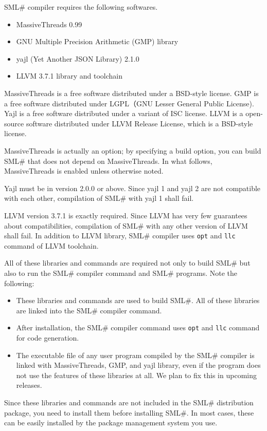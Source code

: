 \documentclass{jbook}
\newcommand{\smlsharp}{SML\#}
\begin{document}
	\smlsharp{} compiler requires the following softwares.
\begin{itemize}
\item MassiveThreads 0.99
\item GNU Multiple Precision Arithmetic (GMP) library
\item yajl (Yet Another JSON Library) 2.1.0
\item LLVM 3.7.1 library and toolchain
\end{itemize}
	MassiveThreads is a free software distributed under a BSD-style
license.
	GMP is a free software distributed under LGPL（GNU Lesser General
Public License).
	Yajl is a free software distributed under a variant of ISC license.
	LLVM is a open-source software distributed under LLVM Release License,
which is a BSD-style license.

	MassiveThreads is actually an option;
by specifying a build option,
you can build \smlsharp{} that does not depend on MassiveThreads.
	In what follows,
MassiveThreads is enabled unless otherwise noted.

	Yajl must be in version 2.0.0 or above.
	Since yajl 1 and yajl 2 are not compatible with each other,
compilation of \smlsharp{} with yajl 1 shall fail.

	LLVM version 3.7.1 is exactly required.
	Since LLVM has very few guarantees about compatibilities,
compilation of \smlsharp{} with any other version of LLVM shall fail.
	In addition to LLVM library,
\smlsharp{} compiler uses {\tt opt} and {\tt llc} command of
LLVM toolchain.

	All of these libraries and commands are required not only to
build \smlsharp{} but also to run the \smlsharp{} compiler command
and \smlsharp{} programs.
	Note the following:
\begin{itemize}
\item
	These libraries and commands are used to build \smlsharp{}.
	All of these libraries are linked into the \smlsharp{} compiler
command.
\item
	After installation,
the \smlsharp{} compiler command uses
{\tt opt} and {\tt llc} command for code generation.
\item
	The executable file of any user program compiled by the \smlsharp{}
compiler is linked with MassiveThreads, GMP, and yajl library,
even if the program does not use the features of these libraries at all.
	We plan to fix this in upcoming releases.
\end{itemize}

	Since these libraries and commands are not included in the \smlsharp{}
distribution package,
you need to install them before installing \smlsharp.
	In most cases,
these can be easily installed by the package management system you use.
\end{document}
